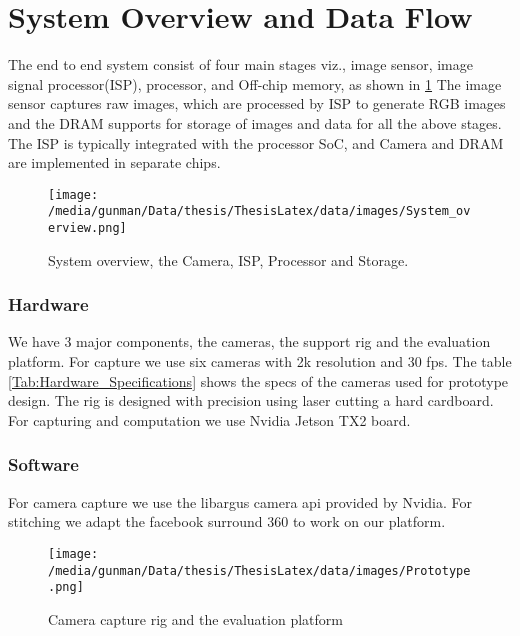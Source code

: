 \section{System Overview and Data Flow}

The end to end system consist of four main stages viz., image sensor, image signal processor(ISP), processor, and Off-chip memory, as shown in \ref{fig:Sys_overview} The image sensor captures raw images, which are processed by ISP to generate RGB images and the DRAM supports for storage of images and data for all the above stages. The ISP is typically integrated with the processor SoC, and Camera and DRAM are implemented in separate chips.
 
\begin{figure}[h]
	\begin{center}
		\texttt{[image: /media/gunman/Data/thesis/ThesisLatex/data/images/System\_overview.png]}
	\end{center}
		\caption{System overview, the Camera, ISP, Processor and Storage.}
\label{fig:Sys_overview}
\end{figure} 

\subsubsection{Hardware}
We have 3 major components, the cameras, the support rig and the evaluation platform. For capture we use six cameras with 2k resolution and 30 fps. The table \ref{Tab:Hardware_Specifications} shows the specs of the cameras used for prototype design. The rig is designed with precision using laser cutting a hard cardboard.  For capturing and computation we use Nvidia Jetson TX2 board.

\subsubsection{Software}
For camera capture we use the libargus camera api provided by Nvidia. For stitching we adapt the facebook surround 360 to work on our platform.
\begin{figure}[h]
	\begin{center}
		\texttt{[image: /media/gunman/Data/thesis/ThesisLatex/data/images/Prototype.png]}
	\end{center}
	\caption{Camera capture rig and the evaluation platform}
	\label{fig:Prototype}
\end{figure} 


